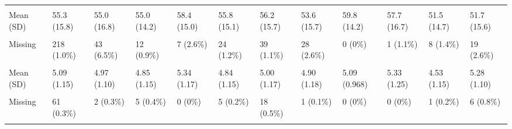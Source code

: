\documentclass[
  single column]{article}
\begin{document}
\begin{landscape}
\begin{longtable}[t]{llllllllllll}
\cellcolor{gray!10}{New Zealand Socio-Economic Index 2018 (Level)} & \cellcolor{gray!10}{} & \cellcolor{gray!10}{} & \cellcolor{gray!10}{} & \cellcolor{gray!10}{} & \cellcolor{gray!10}{} & \cellcolor{gray!10}{} & \cellcolor{gray!10}{} & \cellcolor{gray!10}{} & \cellcolor{gray!10}{} & \cellcolor{gray!10}{} & \cellcolor{gray!10}{}\\
Mean (SD) & 55.3 (15.8) & 55.0 (16.8) & 55.0 (14.2) & 58.4 (15.0) & 55.8 (15.1) & 56.2 (15.7) & 53.6 (15.7) & 59.8 (14.2) & 57.7 (16.7) & 51.5 (14.7) & 51.7 (15.6)\\
\cellcolor{gray!10}{Median [Min, Max]} & \cellcolor{gray!10}{59.0 [10.0, 90.0]} & \cellcolor{gray!10}{60.0 [11.0, 90.0]} & \cellcolor{gray!10}{56.0 [12.0, 90.0]} & \cellcolor{gray!10}{60.0 [18.0, 90.0]} & \cellcolor{gray!10}{59.0 [10.0, 90.0]} & \cellcolor{gray!10}{60.0 [10.0, 90.0]} & \cellcolor{gray!10}{52.0 [10.0, 90.0]} & \cellcolor{gray!10}{63.0 [24.0, 90.0]} & \cellcolor{gray!10}{62.5 [11.0, 90.0]} & \cellcolor{gray!10}{48.0 [10.0, 90.0]} & \cellcolor{gray!10}{51.0 [11.0, 90.0]}\\
Missing & 218 (1.0\%) & 43 (6.5\%) & 12 (0.9\%) & 7 (2.6\%) & 24 (1.2\%) & 39 (1.1\%) & 28 (2.6\%) & 0 (0\%) & 1 (1.1\%) & 8 (1.4\%) & 19 (2.6\%)\\
\addlinespace
\cellcolor{gray!10}{Openness (Personality Trait)} & \cellcolor{gray!10}{} & \cellcolor{gray!10}{} & \cellcolor{gray!10}{} & \cellcolor{gray!10}{} & \cellcolor{gray!10}{} & \cellcolor{gray!10}{} & \cellcolor{gray!10}{} & \cellcolor{gray!10}{} & \cellcolor{gray!10}{} & \cellcolor{gray!10}{} & \cellcolor{gray!10}{}\\
Mean (SD) & 5.09 (1.15) & 4.97 (1.10) & 4.85 (1.15) & 5.34 (1.17) & 4.84 (1.15) & 5.00 (1.17) & 4.90 (1.18) & 5.09 (0.968) & 5.33 (1.25) & 4.53 (1.15) & 5.28 (1.10)\\
\cellcolor{gray!10}{Median [Min, Max]} & \cellcolor{gray!10}{5.25 [1.00, 7.00]} & \cellcolor{gray!10}{5.00 [1.25, 7.00]} & \cellcolor{gray!10}{4.75 [1.00, 7.00]} & \cellcolor{gray!10}{5.42 [1.50, 7.00]} & \cellcolor{gray!10}{5.00 [1.00, 7.00]} & \cellcolor{gray!10}{5.00 [1.00, 7.00]} & \cellcolor{gray!10}{5.00 [1.75, 7.00]} & \cellcolor{gray!10}{5.25 [2.75, 7.00]} & \cellcolor{gray!10}{5.50 [1.75, 7.00]} & \cellcolor{gray!10}{4.50 [1.00, 7.00]} & \cellcolor{gray!10}{5.50 [1.25, 7.00]}\\
Missing & 61 (0.3\%) & 2 (0.3\%) & 5 (0.4\%) & 0 (0\%) & 5 (0.2\%) & 18 (0.5\%) & 1 (0.1\%) & 0 (0\%) & 0 (0\%) & 1 (0.2\%) & 6 (0.8\%)\\
\cellcolor{gray!10}{Parental Status (Yes/No)} & \cellcolor{gray!10}{} & \cellcolor{gray!10}{} & \cellcolor{gray!10}{} & \cellcolor{gray!10}{} & \cellcolor{gray!10}{} & \cellcolor{gray!10}{} & \cellcolor{gray!10}{} & \cellcolor{gray!10}{} & \cellcolor{gray!10}{} & \cellcolor{gray!10}{} & \cellcolor{gray!10}{}\\

\end{longtable}
\end{landscape}
\end{document}
